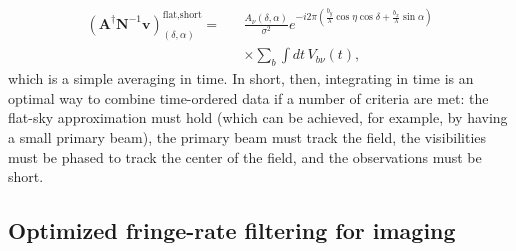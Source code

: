 \documentclass[twocolumn,apj,numberedappendix]{emulateapj}
\newcommand{\vis}{\mathbf{v}}
\newcommand{\A}{\mathbf{A}}
\newcommand{\N}{\mathbf{N}}
\begin{document}
\begin{eqnarray}
\left( \A^\dagger \N^{-1} \vis \right)_{(\delta,\alpha)}^\textrm{flat,short} =  &&\frac{A_\nu(\delta,\alpha)}{\sigma^2} e^{-i 2 \pi \left( \frac{b_y}{\lambda} \cos \eta \cos \delta + \frac{b_x}{\lambda} \sin\alpha \right)} \nonumber \\
&& \times \sum_b   \int  dt \, V_{b\nu}(t),
\end{eqnarray}
which is a simple averaging in time.  In short, then, integrating in time is an
optimal way to combine time-ordered data if a number of criteria are met:
the flat-sky approximation must hold (which can be achieved, for example, by having a small primary beam), the primary beam must track the field,
the visibilities must be phased to track the center of the field, and the
observations must be short.

\subsection{Optimized fringe-rate filtering for imaging}
\label{fringeRateIntro}
\end{document}
